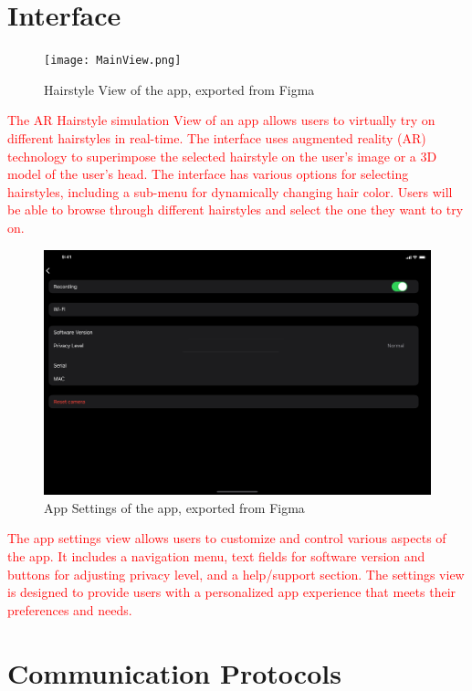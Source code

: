 \documentclass[12pt, titlepage]{article}
\begin{document}
% 

\newpage{}

\appendix

\section{Interface}

\begin{figure}[H]
  \centering
  \texttt{[image: MainView.png]}
  \caption{Hairstyle View of the app, exported from Figma}
  \label{UI:1}
\end{figure}
\textcolor{red}{
The AR Hairstyle simulation View of an app allows users to virtually try on different hairstyles in real-time. The interface uses augmented reality (AR) technology to superimpose the selected hairstyle on the user's image or a 3D model of the user's head. The interface has various options for selecting hairstyles, including a sub-menu for dynamically changing hair color. Users will be able to browse through different hairstyles and select the one they want to try on. 
}


\begin{figure}[H]
  \centering
  \includegraphics[width=0.8\linewidth]{AppSettings.png}
  \caption{App Settings of the app, exported from Figma}
\end{figure}
\textcolor{red}{
The app settings view allows users to customize and control various aspects of the app. It includes a navigation menu, text fields for software version and buttons for adjusting privacy level, and a help/support section. The settings view is designed to provide users with a personalized app experience that meets their preferences and needs.}

\section{Communication Protocols}
\end{document}
